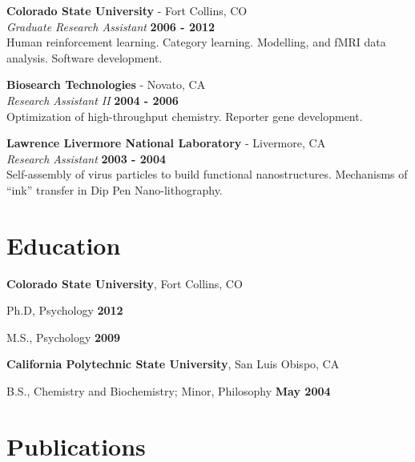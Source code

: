 \documentclass[margin,line]{res}
\newenvironment{list1}{
  \begin{list}{\ding{113}}{%
      \setlength{\itemsep}{0in}
      \setlength{\parsep}{0in} \setlength{\parskip}{0in}
      \setlength{\topsep}{0in} \setlength{\partopsep}{0in}
      \setlength{\leftmargin}{0.17in}}}{\end{list}}
\begin{document}
\begin{resume}
{\bf Colorado State University} - Fort Collins, CO\\
{\em Graduate Research Assistant} \hfill {\bf 2006 - 2012}\\
Human reinforcement learning. Category learning. Modelling, and fMRI data analysis. Software development.

{\bf Biosearch Technologies} - Novato, CA\\
{\em Research Assistant II} \hfill {\bf 2004 - 2006}\\
Optimization of high-throughput chemistry. Reporter gene development.

{\bf Lawrence Livermore National Laboratory} - Livermore, CA\\
{\em Research Assistant} \hfill {\bf 2003 - 2004}\\
Self-assembly of virus particles to build functional nanostructures. Mechanisms of ``ink'' transfer in Dip Pen Nano-lithography.

\section{\sc Education}
{\bf Colorado State University}, Fort Collins, CO\\
\begin{list1}
\item[] Ph.D, Psychology \hfill {\bf 2012}
\item[] M.S., Psychology \hfill {\bf 2009}
\end{list1}

{\bf California Polytechnic State University}, San Luis Obispo, CA\\
\begin{list1}
\item[] B.S., Chemistry and Biochemistry; Minor, Philosophy \hfill {\bf May 2004}
\end{list1}

\section{\sc Publications}




\end{resume}
\end{document}
